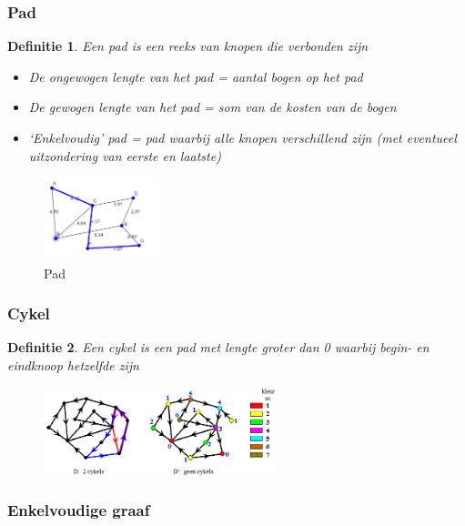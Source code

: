 \documentclass{article}
\newtheorem{theorem}{Definitie}[section]
\begin{document}
\subsubsection{Pad}

\begin{theorem}
    Een pad is een reeks van knopen die verbonden zijn

    \begin{itemize}
        \item De ongewogen lengte van het pad = aantal bogen op het pad
        \item De gewogen lengte van het pad = som van de kosten van de bogen
        \item `Enkelvoudig' pad = pad waarbij alle knopen verschillend zijn (met eventueel uitzondering van eerste en laatste)
    \end{itemize}
\end{theorem}

\begin{figure}[H]
    \centering
    \includegraphics[width=0.3\textwidth]{grafen-pad.png}
    \caption{Pad}
\end{figure}


\subsubsection{Cykel}

\begin{theorem}
    Een cykel is een pad met lengte groter dan 0 waarbij begin- en eindknoop hetzelfde zijn
\end{theorem}

\begin{figure}[H]
    \centering
    \includegraphics[width=0.6\textwidth]{grafen-cykel.png}
\end{figure}

\subsubsection{Enkelvoudige graaf}
\end{document}
